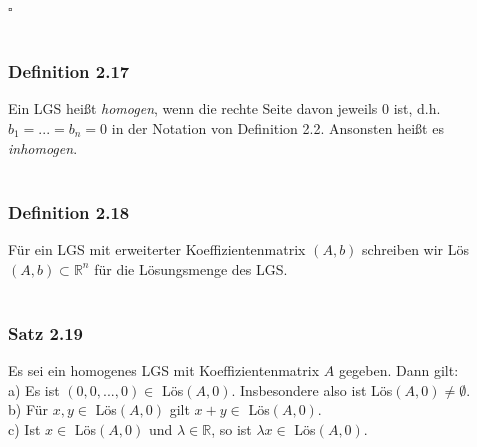 \documentclass{article}
\begin{document}
$\square$ \\
\\
\subsubsection*{Definition 2.17}
Ein LGS heißt \textit{homogen}, wenn die rechte Seite davon jeweils 0 ist, d.h. $b_1=...=b_n=0$ in der Notation von Definition 2.2. 
Ansonsten heißt es \textit{inhomogen}. \\
\\
\subsubsection*{Definition 2.18}
Für ein LGS mit erweiterter Koeffizientenmatrix $(A,b)$ schreiben wir Lös$(A,b) \subset \mathbb{R}^n$ für die Lösungsmenge des LGS. \\
\\
\subsubsection*{Satz 2.19}
Es sei ein homogenes LGS mit Koeffizientenmatrix $A$ gegeben. Dann gilt: \\
a) Es ist $(0,0,...,0) \in$ Lös$(A,0)$. Insbesondere also ist Lös$(A,0) \neq \emptyset$. \\
b) Für $x,y \in$ Lös$(A,0)$ gilt $x+y \in$ Lös$(A,0)$. \\
c) Ist $x \in$ Lös$(A,0)$ und $\lambda \in \mathbb{R}$, so ist $\lambda x \in$ Lös$(A,0)$. \\
\\
\end{document}
